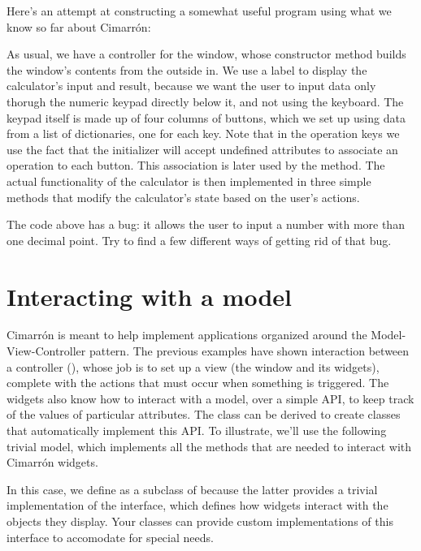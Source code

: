 \documentclass[a4paper]{howto}
\newcommand{\Cimarron}[0]{Cimarrón}
\begin{document}
Here's an attempt at constructing a somewhat useful program using what
we know so far about \Cimarron:



As usual, we have a controller for the window, whose constructor method
builds the window's contents from the outside in. We use a label to
display the calculator's input and result, because we want the user to
input data only thorugh the numeric keypad directly below it, and not
using the keyboard. The keypad itself is made up of four columns of
buttons, which we set up using data from a list of dictionaries, one for
each key. Note that in the operation keys we use the fact that the
initializer will accept undefined attributes to associate an operation
to each button. This association is later used by the 
method. The actual functionality of the calculator is then implemented
in three simple methods that modify the calculator's state based on the
user's actions.

The code above has a bug: it allows the user to input a number with more
than one decimal point. Try to find a few different ways of getting rid
of that bug.

\section{Interacting with a model}

\Cimarron{} is meant to help implement applications organized around the
Model-View-Controller pattern. The previous examples have shown
interaction between a controller (), whose
job is to set up a view (the window and its widgets), complete with the
actions that must occur when something is triggered. The widgets also
know how to interact with a model, over a simple API, to keep track of
the values of particular attributes. The  class can be
derived to create classes that automatically implement this API. To
illustrate, we'll use the following trivial model, which implements all
the methods that are needed to interact with \Cimarron{} widgets.



In this case, we define  as a subclass of 
because the latter provides a trivial implementation of the
 interface, which defines how widgets interact with the
objects they display. Your classes can provide custom implementations of
this interface to accomodate for special needs.
\end{document}
